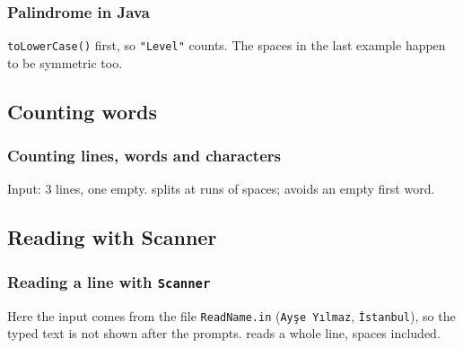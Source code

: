 \documentclass[aspectratio=169,10pt,compress]{beamer}
\begin{document}
\begin{frame}[t,fragile] \frametitle{Palindrome in Java}

  \vspace{0.3em}
  \small \texttt{toLowerCase()} first, so \texttt{"Level"} counts. The spaces in the last example happen to be symmetric too.
\end{frame}




\subsection[Count words]{Counting words}




\begin{frame}[t,fragile] \frametitle{Counting lines, words and characters}

  \vspace{0.3em}
  \small Input: 3 lines, one empty. 
   splits at runs of spaces; 
   avoids an empty first word.
\end{frame}








\subsection[Scanner]{Reading with Scanner}




\begin{frame}[t,fragile] \frametitle{Reading a line with \texttt{Scanner}}

  \vspace{0.3em}
  \small Here the input comes from the file \texttt{ReadName.in} (\texttt{Ayşe Yılmaz}, \texttt{İstanbul}),
  so the typed text is not shown after the prompts. 
   reads a whole line, spaces included.
\end{frame}
\end{document}
